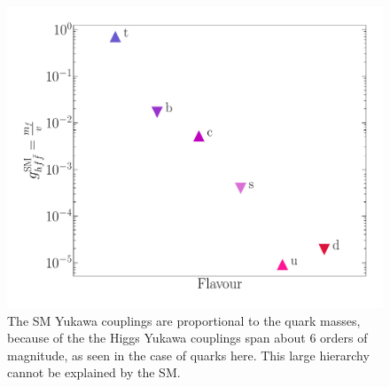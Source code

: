 \begin{figure}[htpb!]
	\centering
	\includegraphics[width=0.5\linewidth]{./figures/yukawa}
	  \caption{The SM Yukawa couplings are proportional to the quark masses, because of the the Higgs Yukawa couplings span about $6$ orders of magnitude, as seen in the case of quarks here. This large hierarchy cannot be explained by the SM. } 
  \label{fig:SMYuk}
\end{figure}
